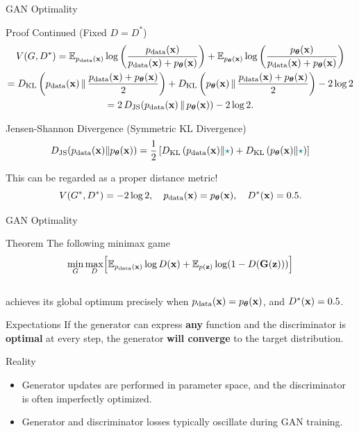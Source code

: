 \documentclass{beamer}
\renewcommand{\eqpause}{}
\renewcommand{\nextonslide}[1]{#1}
\begin{document}
\begin{frame}{GAN Optimality}
	\begin{block}{Proof Continued (Fixed $D = D^*$)}
		\vspace{-0.5cm}
		{\small
		\begin{multline*}
			V(G, D^*) = \bbE_{\pd(\bx)} \log \left( \frac{\pd(\bx)}{\pd(\bx) + \pt(\bx)} \right) + \bbE_{\pt(\bx)} \log \left( \frac{\pt(\bx)}{\pd(\bx) + \pt(\bx)}\right)  \\
		 \nextonslide{= \KL \left(\pd(\bx) \,\|\, \frac{\pd(\bx) + \pt(\bx)}{2}\right) + \KL \left(\pt(\bx) \,\|\, \frac{\pd(\bx) + \pt(\bx)}{2}\right) - 2\log 2 \\}
		 \nextonslide{= 2\,\JSD(\pd(\bx) \,\|\, \pt(\bx)) - 2\log 2.}
		\end{multline*}
		}
	\end{block}
	\eqpause
	\vspace{-0.3cm}
	\begin{block}{Jensen-Shannon Divergence (Symmetric KL Divergence)}
		\vspace{-0.3cm}
		\[
			D_\mathrm{JS}(p_{\text{data}}(\mathbf{x}) \| p_{\boldsymbol{\theta}}(\mathbf{x})) = \frac{1}{2} \left[D_\mathrm{KL} \left(p_{\text{data}}(\mathbf{x}) \| {\color{teal}\star}\right) + D_\mathrm{KL} \left(p_{\boldsymbol{\theta}}(\mathbf{x}) \| {\color{teal}\star}\right) \right]
		\]
	\end{block}
	\eqpause
	This can be regarded as a proper distance metric!
	\[
		V(G^*, D^*) = -2\log 2, \quad p_{\text{data}}(\mathbf{x}) = p_{\boldsymbol{\theta}}(\mathbf{x}), \quad  D^*(\mathbf{x}) = 0.5.
	\]
\end{frame}
\begin{frame}{GAN Optimality}
	\begin{block}{Theorem}
		The following minimax game 
		\vspace{-0.3cm}
		\[
		\min_{G} \max_D \Bigl[ \mathbb{E}_{p_{\text{data}}(\mathbf{x})} \log D(\mathbf{x}) + \mathbb{E}_{p(\mathbf{z})} \log (1 - D(\mathbf{G}(\mathbf{z}))) \Bigr]
		\]
		\vspace{-0.5cm} \\
		achieves its global optimum precisely when $p_{\text{data}}(\mathbf{x}) = p_{\boldsymbol{\theta}}(\mathbf{x})$, and $D^*(\mathbf{x}) = 0.5$.
	\end{block}
	\vspace{-0.2cm}
	\begin{block}{Expectations}
		If the generator can express \textbf{any} function and the discriminator is \textbf{optimal} at every step, the generator \textbf{will converge} to the target distribution.
	\end{block}
	\vspace{-0.3cm}
	\eqpause
	\begin{block}{Reality}
		\begin{itemize}
			\item Generator updates are performed in parameter space, and the discriminator is often imperfectly optimized.
			\item Generator and discriminator losses typically oscillate during GAN training.
		\end{itemize}
	\end{block}
\end{frame}
\end{document}
